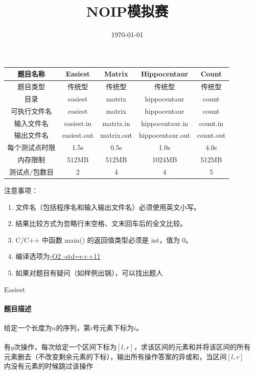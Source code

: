 \documentclass[UTF8]{ctexart}
\begin{document}
\title{NOIP模拟赛}
\author{}
\date{\today}
\maketitle
\begin{table}[!htbp]
	\centering
	\begin{tabular}{|c|c|c|c|c|}
		\hline
		题目名称&Easiest&Matrix&Hippocentaur&Count\\
		\hline
		题目类型&传统型&传统型&传统型&传统型\\
		\hline
		目录&easiest&matrix&hippocentaur&count\\
		\hline
		可执行文件名&easiest&matrix&hippocentaur&count\\
		\hline
		输入文件名&easiest.in&matrix.in&hippocentaur.in&count.in\\
		\hline
		输出文件名&easiest.out&matrix.out&hippocentaur.out&count.out\\
		\hline
		每个测试点时限&1.5s&0.5s&1.0s&4.0s\\
		\hline
		内存限制&512MB&512MB&1024MB&512MB\\
		\hline
		测试点/包数目&2&4&4&5\\
		\hline
	\end{tabular}
\end{table}
注意事项：
\begin{enumerate}
	\item 文件名（包括程序名和输入输出文件名）必须使用英文小写。
	\item 结果比较方式为忽略行末空格、文末回车后的全文比较。
	\item C/C++ 中函数 main() 的返回值类型必须是 int，值为 0。
	\item 编译选项为\underline{-O2 -std=c++11}
	\item 如果对题目有疑问（如样例出锅），可以找出题人
\end{enumerate}
\clearpage


\begin{center}
	\large{Easiest}
\end{center}
\paragraph{题目描述}
\paragraph{}给定一个长度为$n$的序列，第$i$号元素下标为$i$。
\paragraph{}有$q$次操作，每次给定一个区间下标为$[l,r]$，求该区间的元素和并将该区间的所有元素删去（不改变剩余元素的下标），输出所有操作答案的异或和，当区间$[l,r]$内没有元素的时候跳过该操作
\end{document}
